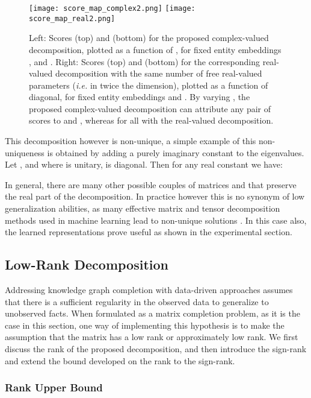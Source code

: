 \documentclass[twoside,11pt]{article}
\renewcommand{\cite}{\citep}
\begin{document}
\begin{figure}[ht]
	\centering
\texttt{[image: score\_map\_complex2.png]}
\texttt{[image: score\_map\_real2.png]}
    \caption{Left: Scores  (top) and  (bottom) for the proposed complex-valued decomposition, plotted as a function of , for fixed entity embeddings , and . Right: Scores  (top) and  (bottom) for the corresponding real-valued decomposition with the same number of free real-valued parameters (\textit{i.e.} in twice the dimension), plotted as a function of  diagonal, for fixed entity embeddings  and . By varying , the proposed complex-valued decomposition can attribute any pair of scores to  and , whereas  for all  with the real-valued decomposition.}
	\label{fig:complex_vs_real_decomp}
\end{figure}


This decomposition however is non-unique, a simple example of this non-uniqueness 
is obtained by adding a purely imaginary constant to the eigenvalues.
Let , and  where  is unitary,  is diagonal. Then for any real constant  we have:


In general, there are many other possible couples of matrices  and 
that preserve the real part of the decomposition.
In practice however this is no synonym of low generalization abilities, 
as many effective matrix and tensor decomposition methods 
used in machine learning lead to non-unique solutions 
\cite{paatero1994positive,Nickel2011}.
In this case also, the learned representations prove useful as 
shown in the experimental section.

\subsection{Low-Rank Decomposition}

Addressing knowledge graph completion with data-driven approaches 
assumes that there is a sufficient regularity in
the observed data to generalize to unobserved facts. When formulated as 
a matrix completion problem, as it is the case in this section, one way
of implementing this hypothesis is to make the assumption
that the matrix has a low rank or approximately low rank.
We first discuss the rank of the proposed decomposition, and then introduce 
the sign-rank and extend the bound developed on the rank to the sign-rank.


\subsubsection{Rank Upper Bound}
\end{document}
